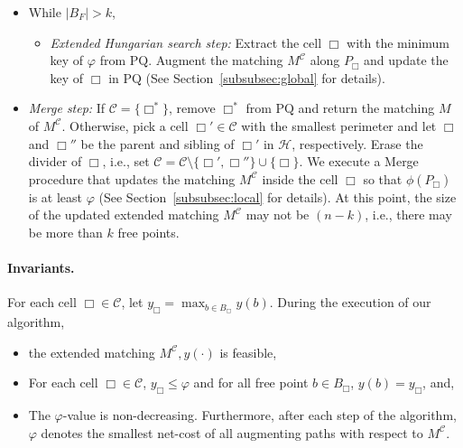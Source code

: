 \documentclass[11pt,onecolumn]{article}
\def\mcC{{\mathcal{C}}}
\def\mcH{{\mathcal{H}}}
\newcommand{\cell}{\Box}
\newcommand{\pq}{\mathrm{PQ}}
\newcommand{\ymax}{\varphi}
\begin{document}
\begin{itemize}
    \item While $|B_F| > k$, 
    \begin{itemize}
        \item {\it Extended Hungarian search step:} Extract the cell $\cell$ with the minimum key of $\ymax$ from $\pq$. Augment the matching $M^\mcC$ along $P_\cell$ and update the key of $\cell$ in $\pq$ (See Section~\ref{subsubsec:global} for details).
    \end{itemize}
    \item {\it Merge step:} If $\mcC=\{\cell^*\}$, remove $\cell^*$ from $\pq$ and return the matching $M$ of $M^{\mcC}$. Otherwise, pick a cell $\cell'\in\mcC$ with the smallest perimeter and let $\cell$ and $\cell''$ be the parent and sibling of $\cell'$ in $\mcH$, respectively. Erase the divider of $\cell$, i.e., set $\mcC=\mcC\setminus\{\cell',\cell''\}\cup \{\cell\}$. 
    We execute a Merge procedure that updates the matching $M^\mcC$ inside the cell $\cell$ so that $\phi(P_\cell)$ is at least $\ymax$ (See Section~\ref{subsubsec:local} for details). At this point, the size of the updated extended matching $M^{\mcC}$ may not be $(n-k)$, i.e., there may be more than $k$ free points.
\end{itemize}

\paragraph{Invariants.} For each cell $\cell \in \mcC$, let $y_\cell= \max_{b\in B_\cell}y(b)$. During the execution of our algorithm,
\begin{itemize}
    \item[(I1)] the extended matching $M^\mcC, y(\cdot)$ is feasible,
    \item[(I2)] For each cell $\cell \in \mcC$, $y_\cell \le \ymax$ and for all free point $b\in B_\cell$, $y(b)=y_{\cell}$, and,
   \item[(I3)] The $\ymax$-value is non-decreasing. Furthermore, after each step of the algorithm, $\ymax$ denotes the smallest net-cost of all augmenting paths with respect to $M^{\mcC}$.
\end{itemize}
\end{document}
